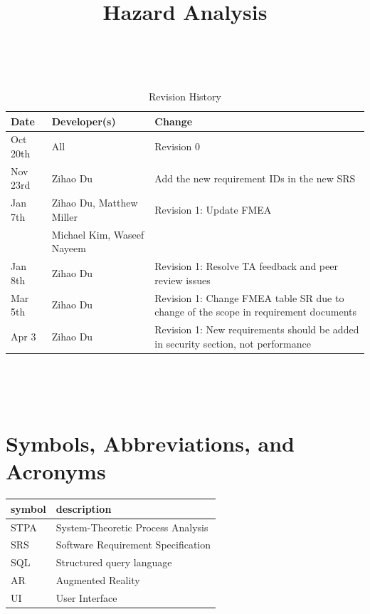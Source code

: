 \documentclass{article}
\title{Hazard Analysis\\\progname}
\author{\authname}
\date{}
\begin{document}
\maketitle
\thispagestyle{empty}

~\newpage


\begin{table}[hp]
\caption{Revision History} \label{TblRevisionHistory}
\begin{tabularx}{\textwidth}{llX}
\toprule
\textbf{Date} & \textbf{Developer(s)} & \textbf{Change}\\
\midrule
Oct 20th & All & Revision 0\\
Nov 23rd & Zihao Du & Add the new requirement IDs in the new SRS\\
Jan 7th & Zihao Du, Matthew Miller & Revision 1: Update FMEA\\
& Michael Kim, Waseef Nayeem & \\
Jan 8th & Zihao Du & Revision 1: Resolve TA feedback and peer review issues\\
Mar 5th & Zihao Du & Revision 1: Change FMEA table SR due to change of the scope in requirement documents\\
Apr 3 & Zihao Du & Revision 1: New requirements should be added in security section, not performance\\
\bottomrule
\end{tabularx}
\end{table}

~\newpage

\tableofcontents

~\newpage


\section{Symbols, Abbreviations, and Acronyms}

\renewcommand{\arraystretch}{1.2}
\begin{tabular}{l l} 
  \toprule		
  \textbf{symbol} & \textbf{description}\\
  \midrule 
  STPA & System-Theoretic Process Analysis\\
  \midrule
  SRS & Software Requirement Specification\\
  \midrule
  SQL & Structured query language\\
  \midrule
  AR & Augmented Reality\\
  \midrule
  UI & User Interface\\
  \bottomrule
\end{tabular}\\
\end{document}
